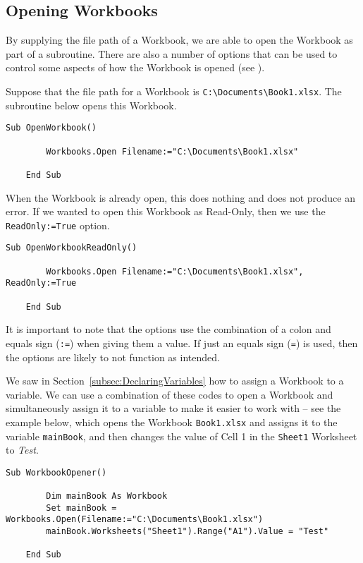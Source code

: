 \documentclass[11pt]{article}%
\begin{document}

\subsection{Opening Workbooks}

By supplying the file path of a Workbook, we are able to open the Workbook as part of a subroutine. There are also a number of options that can be used to control some aspects of how the Workbook is opened (see \cite{WorkbooksOpen}).

Suppose that the file path for a Workbook is \texttt{C:\textbackslash Documents\textbackslash Book1.xlsx}. The subroutine below opens this Workbook.\\

\begin{lstlisting}[style=A]
    Sub OpenWorkbook()

        Workbooks.Open Filename:="C:\Documents\Book1.xlsx"

    End Sub
\end{lstlisting}

When the Workbook is already open, this does nothing and does not produce an error. If we wanted to open this Workbook as Read-Only, then we use the \texttt{ReadOnly:=True} option.\\

\begin{lstlisting}[style=A]
    Sub OpenWorkbookReadOnly()

        Workbooks.Open Filename:="C:\Documents\Book1.xlsx", ReadOnly:=True

    End Sub
\end{lstlisting}

It is important to note that the options use the combination of a colon and equals sign (\texttt{:=}) when giving them a value. If just an equals sign (\texttt{=}) is used, then the options are likely to not function as intended.

We saw in Section~\ref{subsec:DeclaringVariables} how to assign a Workbook to a variable. We can use a combination of these codes to open a Workbook and simultaneously assign it to a variable to make it easier to work with -- see the example below, which opens the Workbook \texttt{Book1.xlsx} and assigns it to the variable \texttt{mainBook}, and then changes the value of Cell 1 in the \texttt{Sheet1} Worksheet to \textit{Test}.\\

\begin{lstlisting}[style=A]
    Sub WorkbookOpener()

        Dim mainBook As Workbook
        Set mainBook = Workbooks.Open(Filename:="C:\Documents\Book1.xlsx")
        mainBook.Worksheets("Sheet1").Range("A1").Value = "Test"

    End Sub
\end{lstlisting}
\end{document}
